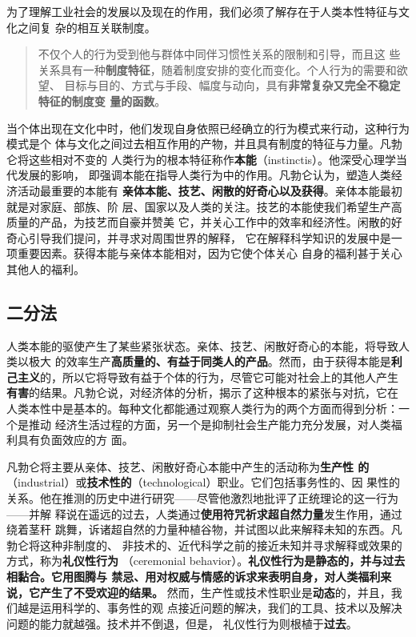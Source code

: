 为了理解工业社会的发展以及现在的作用，我们必须了解存在于人类本性特征与文化之间复
杂的相互关联制度。
\begin{quotation}不仅个人的行为受到他与群体中同伴习惯性关系的限制和引导，而且这
些关系具有一种\textbf{制度特征}，随着制度安排的变化而变化。个人行为的需要和欲望、
目标与目的、方式与手段、幅度与动向，具有\textbf{非常复杂又完全不稳定特征的制度变
量的函数}。
\end{quotation}

当个体出现在文化中时，他们发现自身依照已经确立的行为模式来行动，这种行为模式是个
体与文化之间过去相互作用的产物，并且具有制度的特征与力量。凡勃仑将这些相对不变的
人类行为的根本特征称作\textbf{本能}（instinctis）。他深受心理学当代发展的影响，
即强调本能在指导人类行为中的作用。凡勃仑认为，塑造人类经济活动最重要的本能有
\textbf{亲体本能、技艺、闲散的好奇心以及获得}。亲体本能最初就是对家庭、部族、阶
层、国家以及人类的关注。技艺的本能使我们希望生产高质量的产品，为技艺而自豪并赞美
它，并关心工作中的效率和经济性。闲散的好奇心引导我们提问，并寻求对周围世界的解释，
它在解释科学知识的发展中是一项重要因素。获得本能与亲体本能相对，因为它使个体关心
自身的福利甚于关心其他人的福利。

\subsection{二分法}

人类本能的驱使产生了某些紧张状态。亲体、技艺、闲散好奇心的本能，将导致人类以极大
的效率生产\textbf{高质量的、有益于同类人的产品}。然而，由于获得本能是\textbf{利
己主义}的，所以它将导致有益于个体的行为，尽管它可能对社会上的其他人产生
\textbf{有害}的结果。凡勃仑说，对经济体的分析，揭示了这种根本的紧张与对抗，它在
人类本性中是基本的。每种文化都能通过观察人类行为的两个方面而得到分析：一个是推动
经济生活过程的方面，另一个是抑制社会生产能力充分发展，对人类福利具有负面效应的方
面。

凡勃仑将主要从亲体、技艺、闲散好奇心本能中产生的活动称为\textbf{生产性
的}（industrial）或\textbf{技术性的}（technological）职业。它们包括事务性的、因
果性的关系。他在推测的历史中进行研究——尽管他激烈地批评了正统理论的这一行为——并解
释说在遥远的过去，人类通过\textbf{使用符咒祈求超自然力量}发生作用，通过绕着茎秆
跳舞，诉诸超自然的力量种植谷物，并试图以此来解释未知的东西。凡勃仑将这种非制度的、
非技术的、近代科学之前的接近未知并寻求解释或效果的方式，称为\textbf{礼仪性行为}
（ceremonial behavior）。\textbf{礼仪性行为是静态的，并与过去相黏合。它用图腾与
禁忌、用对权威与情感的诉求来表明自身，对人类福利来说，它产生了不受欢迎的结果。}
然而，生产性或技术性职业是\textbf{动态}的，并且，我们越是运用科学的、事务性的观
点接近问题的解决，我们的工具、技术以及解决问题的能力就越强。技术并不倒退，但是，
礼仪性行为则根植于\textbf{过去}。

